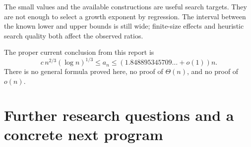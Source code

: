 \documentclass[11pt,letterpaper]{article}
\theoremstyle{definition}
\begin{document}
The small values and the available constructions are useful search
targets. They are not enough to select a growth exponent by regression.
The interval between the known lower and upper bounds is still wide;
finite-size effects and heuristic search quality both affect the
observed ratios.

The proper current conclusion from this report is
\[
 c\,n^{2/3}(\log n)^{1/3}
 \le a_n
 \le (1.848895345709\ldots+o(1))n.
\]
There is no general formula proved here, no proof of \(\Theta(n)\),
and no proof of \(o(n)\).

\section{Further research questions and a concrete next program}
\label{sec:future}
\end{document}
